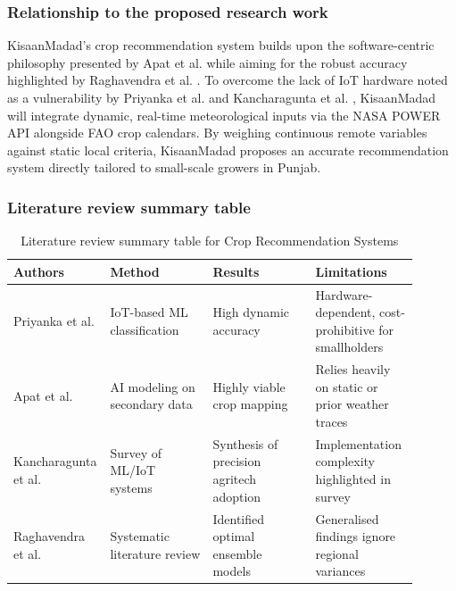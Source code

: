 \documentclass{FastFyp}
\begin{document}
\subsubsection{Relationship to the proposed research work}
KisaanMadad's crop recommendation system builds upon the software-centric philosophy presented by Apat et al. \cite{apat2023artificial} while aiming for the robust accuracy highlighted by Raghavendra et al. \cite{raghavendra2024systematic}. To overcome the lack of IoT hardware noted as a vulnerability by Priyanka et al. \cite{priyanka2023iot} and Kancharagunta et al. \cite{kancharagunta2024crop}, KisaanMadad will integrate dynamic, real-time meteorological inputs via the NASA POWER API alongside FAO crop calendars. By weighing continuous remote variables against static local criteria, KisaanMadad proposes an accurate recommendation system directly tailored to small-scale growers in Punjab.

\subsubsection{Literature review summary table}
\begin{table}[htbp]
  \centering
  \caption{Literature review summary table for Crop Recommendation Systems}
  \label{tab:crop_recommendation}
  \begin{tabular}{p{0.15\linewidth} p{0.25\linewidth} p{0.25\linewidth} p{0.25\linewidth}}
    \toprule
    \textbf{Authors} & \textbf{Method} & \textbf{Results} & \textbf{Limitations} \\
    \midrule
    Priyanka et al. \cite{priyanka2023iot} & IoT-based ML classification & High dynamic accuracy & Hardware-dependent, cost-prohibitive for smallholders \\
    Apat et al. \cite{apat2023artificial} & AI modeling on secondary data & Highly viable crop mapping & Relies heavily on static or prior weather traces \\
    Kancharagunta et al. \cite{kancharagunta2024crop} & Survey of ML/IoT systems & Synthesis of precision agritech adoption & Implementation complexity highlighted in survey \\
    Raghavendra et al. \cite{raghavendra2024systematic} & Systematic literature review & Identified optimal ensemble models & Generalised findings ignore regional variances \\
    \bottomrule
  \end{tabular}
\end{table}
\end{document}
